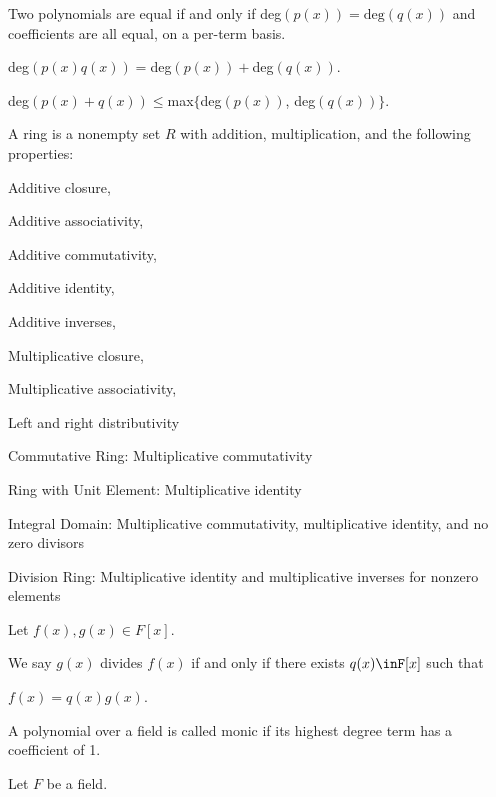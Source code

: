 \documentclass{article}
\begin{document}

    Two polynomials are equal if and only if deg$(p(x)) = \text{deg}(q(x))$ and coefficients are all equal, on a per-term basis.
    

    deg$(p(x)q(x))=$deg$(p(x)) + $deg$(q(x))$.
    
    deg$(p(x) + q(x))\leq$max$\{$deg$(p(x))$, deg$(q(x))$$\}$.


    A ring is a nonempty set $R$ with addition, multiplication, and the following properties:
    
    \indent\indent Additive closure,

    \indent\indent Additive associativity,

    \indent\indent Additive commutativity,

    \indent\indent Additive identity,

    \indent\indent Additive inverses,

    \indent\indent Multiplicative closure,

    \indent\indent Multiplicative associativity,
    
    \indent\indent Left and right distributivity


    Commutative Ring: Multiplicative commutativity
    
    Ring with Unit Element: Multiplicative identity
    
    Integral Domain: Multiplicative commutativity, multiplicative identity, and no zero divisors
    
    Division Ring: Multiplicative identity and multiplicative inverses for nonzero elements


Let $f(x), g(x) \in F[x]$.

We say $g(x)$ divides $f(x)$ if and only if there exists $q(x)\inF[x]$ such that

\indent\indent$f(x)=q(x)g(x)$.


A polynomial over a field is called monic if its highest degree term has a coefficient of 1.


Let $F$ be a field.
\end{document}
